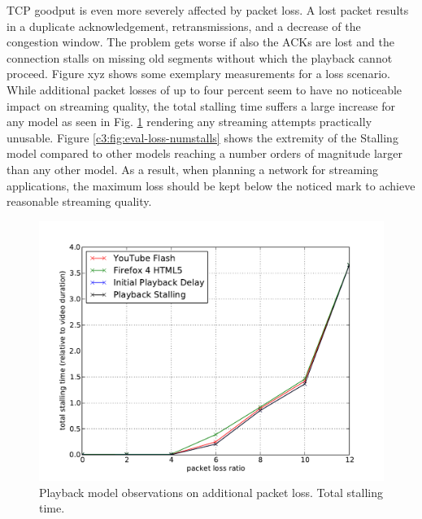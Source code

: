 TCP goodput is even more severely affected by packet loss. A lost packet results in a duplicate acknowledgement, retransmissions, and a decrease of the congestion window. The problem gets worse if also the ACKs are lost and the connection stalls on missing old segments without which the playback cannot proceed. Figure xyz shows some exemplary measurements for a loss scenario. While additional packet losses of up to four percent seem to have no noticeable impact on streaming quality, the total stalling time suffers a large increase for any model as seen in Fig. \ref{c3:fig:eval-loss-stallingtime} rendering any streaming attempts practically unusable. Figure \ref{c3:fig:eval-loss-numstalls} shows the extremity of the Stalling model compared to other models reaching a number orders of magnitude larger than any other model.
As a result, when planning a network for streaming applications, the maximum loss should be kept below the noticed mark to achieve reasonable streaming quality. 


\begin{figure}[htb]
    \centering
    \includegraphics[width=\textwidth]{images/eval-loss4mb-stallingtime.pdf}
    \caption{Playback model observations on additional packet loss. Total stalling time.}
    \label{c3:fig:eval-loss-stallingtime}
\end{figure}

